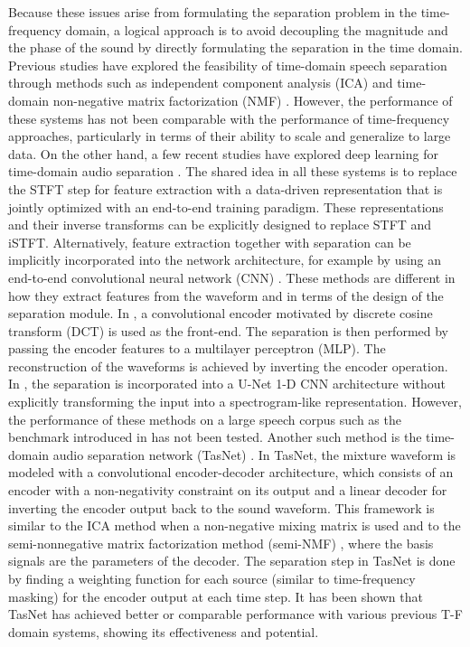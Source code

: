 \documentclass[journal]{IEEEtran}
\begin{document}
Because these issues arise from formulating the separation problem in the time-frequency domain, a logical approach is to avoid decoupling the magnitude and the phase of the sound by directly formulating the separation in the time domain. Previous studies have explored the feasibility of time-domain speech separation through methods such as independent component analysis (ICA) \cite{choi2005blind} and time-domain non-negative matrix factorization (NMF) \cite{yoshii2013beyond}. However, the performance of these systems has not been comparable with the performance of time-frequency approaches, particularly in terms of their ability to scale and generalize to large data. On the other hand, a few recent studies have explored deep learning for time-domain audio separation \cite{venkataramani2017end, stoller2018wave, luo2018tasnet}. The shared idea in all these systems is to replace the STFT step for feature extraction with a data-driven representation that is jointly optimized with an end-to-end training paradigm. These representations and their inverse transforms can be explicitly designed to replace STFT and iSTFT. Alternatively, feature extraction together with separation can be implicitly incorporated into the network architecture, for example by using an end-to-end convolutional neural network (CNN) \cite{fu2018end, pascual2017segan}. These methods are different in how they extract features from the waveform and in terms of the design of the separation module. In \cite{venkataramani2017end}, a convolutional encoder motivated by discrete cosine transform (DCT) is used as the front-end. The separation is then performed by passing the encoder features to a multilayer perceptron (MLP). The reconstruction of the waveforms is achieved by inverting the encoder operation. In \cite{stoller2018wave}, the separation is incorporated into a U-Net 1-D CNN architecture \cite{ronneberger2015u} without explicitly transforming the input into a spectrogram-like representation. However, the performance of these methods on a large speech corpus such as the benchmark introduced in \cite{hershey2016deep} has not been tested. Another such method is the time-domain audio separation network (TasNet) \cite{luo2018tasnet, luo2018real}. In TasNet, the mixture waveform is modeled with a convolutional encoder-decoder architecture, which consists of an encoder with a non-negativity constraint on its output and a linear decoder for inverting the encoder output back to the sound waveform. This framework is similar to the ICA method when a non-negative mixing matrix is used \cite{wang2010nonnegative} and to the semi-nonnegative matrix factorization method (semi-NMF) \cite{ding2010convex}, where the basis signals are the parameters of the decoder. The separation step in TasNet is done by finding a weighting function for each source (similar to time-frequency masking) for the encoder output at each time step. It has been shown that TasNet has achieved better or comparable performance with various previous T-F domain systems, showing its effectiveness and potential. 
\end{document}
